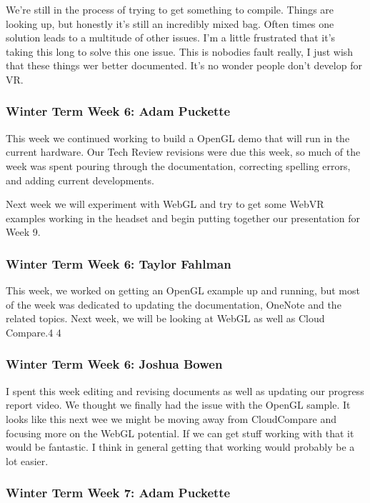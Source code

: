 \documentclass[draftclsnofoot,onecolumn]{IEEEtran}
\begin{document}
We're still in the process of trying to get something to compile. Things are looking up, but honestly it's still an incredibly mixed bag. Often times one solution leads to a multitude of other issues. I'm a little frustrated that it's taking this long to solve this one issue. This is nobodies fault really, I just wish that these things wer better documented. It's no wonder people don't develop for VR.

\subsubsection{Winter Term Week 6: Adam Puckette}

This week we continued working to build a OpenGL demo that will run in the current hardware. Our Tech Review revisions were due this week, so much of the week was spent pouring through the documentation, correcting spelling errors, and adding current developments.

Next week we will experiment with WebGL and try to get some WebVR examples working in the headset and begin putting together our presentation for Week 9.

\subsubsection{Winter Term Week 6: Taylor Fahlman}

This week, we worked on getting an OpenGL example up and running, but most of the week was dedicated to updating the documentation, OneNote and the related topics. Next week, we will be looking at WebGL as well as Cloud Compare.4 4

\subsubsection{Winter Term Week 6: Joshua Bowen}

I spent this week editing and revising documents as well as updating our progress report video. We thought we finally had the issue with the OpenGL sample. It looks like this next wee we might be moving away from CloudCompare and focusing more on the WebGL potential. If we can get stuff working with that it would be fantastic. I think in general getting that working would probably be a lot easier.

\subsubsection{Winter Term Week 7: Adam Puckette}
\end{document}
